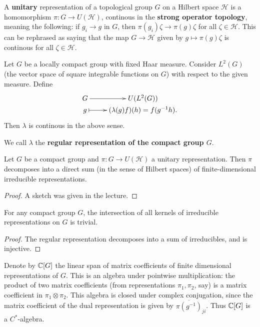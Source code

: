 \documentclass[11pt, english]{article}
\begin{document}
A \textbf{unitary} representation of a topological group $G$ on a Hilbert space $\mathcal H$ is a homomorphism $\pi:G \to U(\mathcal H)$, continous in the \textbf{strong operator topology}, meaning the following: if $g_i \to g$ in $G$, then $\pi(g_i) \zeta \to \pi(g)\zeta$ for all $\zeta \in \mathcal H$. This can be rephrased as saying that the map $G \to \mathcal H$ given by $g \mapsto \pi(g) \zeta $ is continous for all $\zeta \in \mathcal H$.

\begin{example}
 Let $G$ be a locally compact group with fixed Haar measure. Consider $L^2(G)$ (the vector space of square integrable functions on $G$) with respect to the given measure. Define
$$
\xymatrix @ R = 0mm{
G \ar[r] &U(L^2(G)) \\
g \ar@{|->}[r] & (\lambda(g)f)(h) = f(g^{-1}h).
}
$$
Then $\lambda$ is continous in the above sense.

We call $\lambda$ the \textbf{regular representation of the compact group $G$}.
\end{example}

\begin{thm}
\label{thmpeterweyl}
Let $G$ be a compact group and $\pi:G \to U(\mathcal H)$ a unitary representation. Then $\pi$ decomposes into a direct sum (in the sense of Hilbert spaces) of finite-dimensional irreducible representations.
  
\end{thm}

\begin{proof}
A sketch was given in the lecture.
\end{proof}

\begin{corr}
For any compact group $G$, the intersection of all kernels of irreducible representations on $G$ is trivial.
\end{corr}
\begin{proof}
The regular representation decomposes into a sum of irreducibles, and is injective. 
\end{proof}

Denote by $\mathbb{C}[G]$ the linear span of matrix coefficients of finite dimensional representations of $G$. This is an algebra under pointwise multiplication: the product of two matrix coefficients (from representations $\pi_1,\pi_2$, say) is a matrix coefficient in $\pi_1 \otimes \pi_2$. This algebra is closed under complex conjugation, since the matrix coefficient of the dual representation is given by $\overline{\pi(g^{-1})}_{ji}$. Thus $\mathbb{C}[G]$ is a $C^\ast$-algebra.
\end{document}
